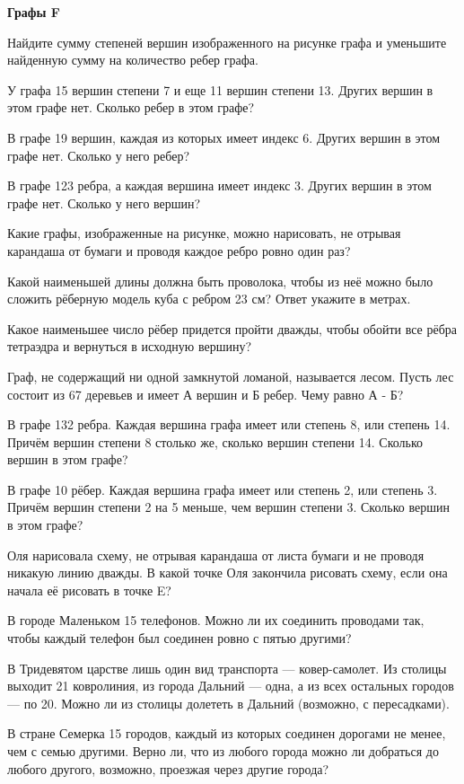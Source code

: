 \centerline{\bf \Huge Графы F}

 Найдите сумму степеней вершин изображенного на рисунке графа и уменьшите найденную сумму на количество ребер графа.

 У графа 15 вершин степени 7 и еще 11 вершин степени 13. Других вершин в этом графе нет. Сколько ребер в этом графе?

 В графе 19 вершин, каждая из которых имеет индекс 6. Других вершин в этом графе нет. Сколько у него ребер?

 В графе 123 ребра, а каждая вершина имеет индекс 3. Других вершин в этом графе нет. Сколько у него вершин?

 Какие графы, изображенные на рисунке, можно нарисовать, не отрывая карандаша от бумаги и проводя каждое ребро ровно один раз?

 Какой наименьшей длины должна быть проволока, чтобы из неё можно было сложить рёберную модель куба с ребром 23 см? Ответ укажите в метрах.

 Какое наименьшее число рёбер придется пройти дважды, чтобы обойти все рёбра тетраэдра и вернуться в исходную вершину?

 Граф, не содержащий ни одной замкнутой ломаной, называется лесом. Пусть лес состоит из 67 деревьев и имеет А вершин и Б ребер. Чему равно А - Б?

 В графе 132 ребра. Каждая вершина графа имеет или степень 8, или степень 14. Причём вершин степени 8 столько же, сколько вершин степени 14. Сколько вершин в этом графе?

 В графе 10 рёбер. Каждая вершина графа имеет или степень 2, или степень 3. Причём вершин степени 2 на 5 меньше, чем вершин степени 3. Сколько вершин в этом графе?

 Оля нарисовала схему, не отрывая карандаша от листа бумаги и не проводя никакую линию дважды. В какой точке Оля закончила рисовать схему, если она начала её рисовать в точке E?

 В городе Маленьком 15 телефонов. Можно ли их соединить проводами так, чтобы каждый телефон был соединен ровно с пятью другими?

\newpage
\hspace{3mm}

 В Тридевятом царстве лишь один вид транспорта — ковер-самолет. Из столицы выходит 21 ковролиния, из города Дальний — одна, а из всех остальных городов — по 20. Можно ли из столицы долететь в Дальний (возможно, с пересадками).

 В стране Семерка 15 городов, каждый из которых соединен дорогами не менее, чем с семью другими. Верно ли, что из любого города можно ли добраться до любого другого, возможно, проезжая через другие города?